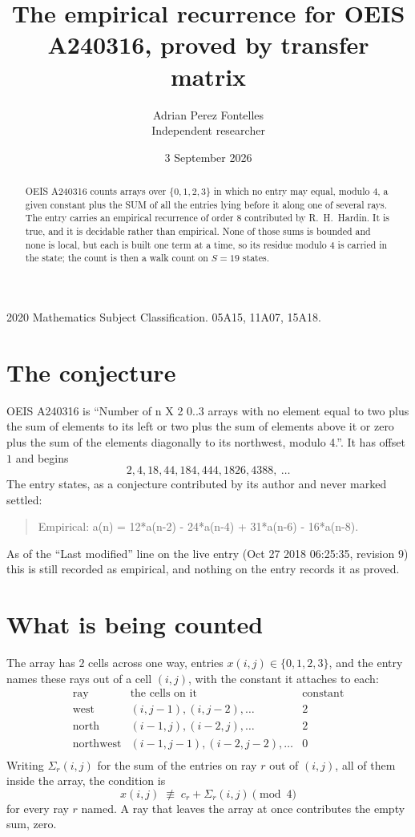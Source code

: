 \documentclass[11pt,a4paper]{article}
\title{The empirical recurrence for OEIS A240316, proved by transfer matrix}
\author{Adrian Perez Fontelles\\ \small Independent researcher}
\date{3 September 2026}
\theoremstyle{plain}
\theoremstyle{definition}
\begin{document}
\maketitle

\begin{abstract}
OEIS A240316 counts arrays over $\{0,1,2,3\}$ in which no entry may equal, modulo $4$, a given
constant plus the SUM of all the entries lying before it along one of several rays. The entry
carries an empirical recurrence of order $8$ contributed by R.~H.~Hardin. It is true, and
it is decidable rather than empirical. None of those sums is bounded and none is local, but
each is built one term at a time, so its residue modulo $4$ is carried in the state; the
count is then a walk count on $S=19$ states.
\end{abstract}

\noindent\small 2020 Mathematics Subject Classification. 05A15, 11A07, 15A18.\normalsize

\section{The conjecture}

OEIS A240316 is ``Number of n X 2 0..3 arrays with no element equal to two plus the sum of elements to its left or two plus the sum of elements above it or zero plus the sum of the elements diagonally to its northwest, modulo 4.''. It has offset $1$ and begins
\[
2, 4, 18, 44, 184, 444, 1826, 4388,\ \dots
\]
The entry states, as a conjecture contributed by its author and never marked settled:
\begin{quote}
Empirical: a(n) = 12*a(n-2) - 24*a(n-4) + 31*a(n-6) - 16*a(n-8).
\end{quote}
As of the ``Last modified'' line on the live entry (Oct 27 2018 06:25:35, revision 9) this is still
recorded as empirical, and nothing on the entry records it as proved.

\section{What is being counted}

The array has $2$ cells across one way, entries $x(i,j)\in\{0,1,2,3\}$, and the entry names these
rays out of a cell $(i,j)$, with the constant it attaches to each:
\[
\begin{array}{lll}
\text{ray} & \text{the cells on it} & \text{constant} \\[2pt]
\text{west} & (i,j-1),(i,j-2),\dots & 2 \\
\text{north} & (i-1,j),(i-2,j),\dots & 2 \\
\text{northwest} & (i-1,j-1),(i-2,j-2),\dots & 0 \\
\end{array}
\]
Writing $\Sigma_r(i,j)$ for the sum of the entries on ray $r$ out of $(i,j)$, all of them
inside the array, the condition is
\[
x(i,j)\;\not\equiv\;c_r+\Sigma_r(i,j) \pmod{4}
\]
for every ray $r$ named. A ray that leaves the array at once contributes the empty sum,
zero.
\end{document}
